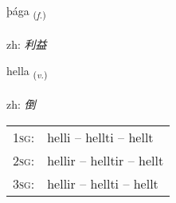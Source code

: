 \documentclass[frontgrid, backgrid]{flacards}\usepackage[]{graphicx}\usepackage[]{color}
\begin{document}
\renewcommand{\flhead}{\vskip5pt \fboxsep=0pt {\small\bfseries\footnotesize Nafnorð | 名词}}
\renewcommand{\fcfoot}{\vskip5pt \fboxsep=0pt \hspace{2pt}{\small\bfseries\footnotesize 2K}}

\renewcommand{\blhead}{\vskip5pt {\small\bfseries\footnotesize Nafnorð | 名词 }}
\renewcommand{\bcfoot}{\vskip5pt \hspace{2pt}{\small\bfseries\footnotesize 2K}}


{þága \small{\textsubscript{(\textit{f.})}} \\[1ex] %
\textphonetic{[θauːɣa]} \\
zh: \emph{利益} \\  [2ex]
\renewcommand*{\arraystretch}{0.8}
}

\renewcommand{\flhead}{\vskip5pt \fboxsep=0pt {\small\bfseries\footnotesize Sagnorð | 动词}}
\renewcommand{\fcfoot}{\vskip5pt \fboxsep=0pt \hspace{2pt}{\small\bfseries\footnotesize 2K}}

\renewcommand{\blhead}{\vskip5pt {\small\bfseries\footnotesize Sagnorð | 动词 }}
\renewcommand{\bcfoot}{\vskip5pt \hspace{2pt}{\small\bfseries\footnotesize 2K}}


{hella \small{\textsubscript{(\textit{v.})}} \\[1ex] %
\textphonetic{[hɛtla]} \\
zh: \emph{倒} \\  [2ex]
\renewcommand*{\arraystretch}{0.8}
\begin{tabular}{p{1cm}l}
\textsc{1sg}: & helli -- hellti -- hellt \\ 
\textsc{2sg}: & hellir -- helltir -- hellt \\ 
\textsc{3sg}: & hellir -- hellti -- hellt \\ 
\end{tabular}
}
\end{document}
